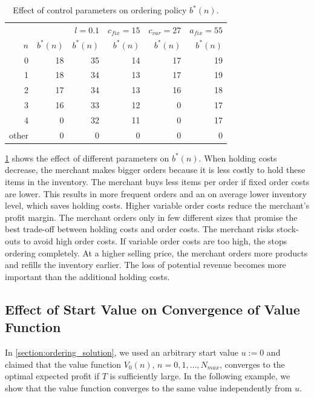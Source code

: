 \begin{table}
	\centering
	\begin{tabular}{rrrrrr}
		\toprule
		& & $l= 0.1$ & $c_{fix} = 15$ & $c_{var} = 27$ & $a_{fix} = 55$ \\
		$n$ & $b^*(n)$ & $b^*(n)$ & $b^*(n)$ & $b^*(n)$ & $b^*(n)$ \\
		\midrule
		0 & 18 & 35 & 14 & 17 & 19\\
		1 & 18 & 34 & 13 & 17 & 19\\
		2 & 17 & 34 & 13 & 16 & 18\\
		3 & 16 & 33 & 12 &  0 & 17\\
		4 &  0 & 32 & 11 &  0 & 17\\
		other & 0 & 0 & 0 & 0 &  0\\
		\bottomrule
	\end{tabular}
	\caption{Effect of control parameters on ordering policy $b^*(n).$}
	\label{table:order_policy_parameter}
\end{table}


\cref{table:order_policy_parameter} shows the effect of different parameters on $b^*(n)$.
When holding costs decrease, the merchant makes bigger orders because it is less costly to hold these items in the inventory.
The merchant buys less items per order if fixed order costs are lower.
This results in more frequent orders and an on average lower inventory level, which saves holding costs.
Higher variable order costs reduce the merchant's profit margin.
The merchant orders only in few different sizes that promise the best trade-off between holding costs and order costs.
The merchant risks stock-outs to avoid high order costs. 
If variable order costs are too high, the stops ordering completely.
At a higher selling price, the merchant orders more products and refills the inventory earlier.
The loss of potential revenue becomes more important than the additional holding costs.

\subsection{Effect of Start Value on Convergence of Value Function}
In \cref{section:ordering_solution}, we used an arbitrary start value $u := 0$ and claimed that the value function $V_0(n)$, $n=0,1,\ldots,N_{max}$, converges to the optimal expected profit if $T$ is sufficiently large.
In the following example, we show that the value function converges to the same value independently from $u$.

